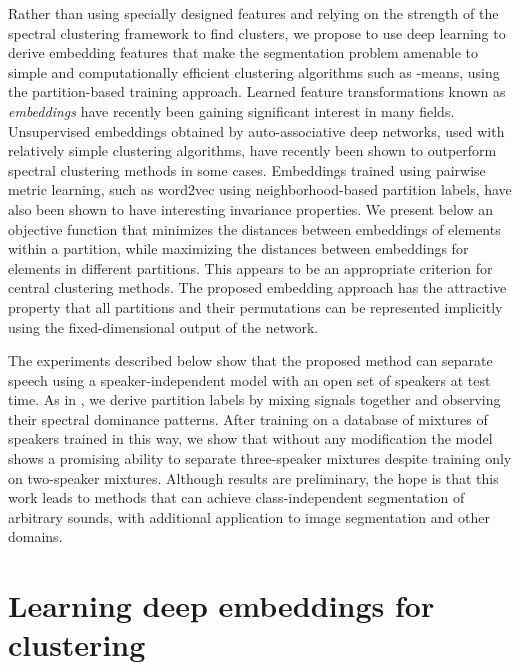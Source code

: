 \documentclass[9pt]{article} \usepackage{nips15submit_e,times}
\begin{document}
Rather than using specially designed features and relying on the strength of the spectral clustering framework to find clusters,  we propose to use deep learning to derive embedding features that make the segmentation problem amenable to simple and computationally efficient clustering algorithms such as -means, using the partition-based training approach. 
Learned feature transformations known as \emph{embeddings} have recently been gaining significant interest in many fields.      Unsupervised embeddings obtained by auto-associative deep networks, used with relatively simple clustering algorithms,  have recently been shown to outperform spectral clustering methods \cite{tian2014learning, huang2014deep} in some cases.    Embeddings trained using pairwise metric learning,  such as word2vec \cite{mikolov2013distributed} using neighborhood-based partition labels,  have also been shown to have interesting invariance properties.  We present below an objective function that minimizes the distances between embeddings of elements within a partition, while maximizing the distances between embeddings for elements in different partitions.   This appears to be an appropriate criterion for central clustering methods.   The proposed embedding approach has the attractive property that all partitions and their permutations can be represented implicitly using the fixed-dimensional output of the network.

The experiments described below show that the proposed method can separate speech using a speaker-independent model with an open set of speakers at test time.
As in \cite{bach2006learning}, we derive partition labels by mixing signals together and observing their spectral dominance patterns.  After training on a database of mixtures of speakers trained in this way, we show that without any modification the model shows a promising ability to separate  three-speaker mixtures despite training only on two-speaker mixtures.  Although results are preliminary, the hope is that this work leads to methods that can achieve class-independent segmentation of arbitrary sounds, with additional application to image segmentation and other domains.   



\section{Learning deep embeddings for clustering}
\label{sec:model}
\end{document}
